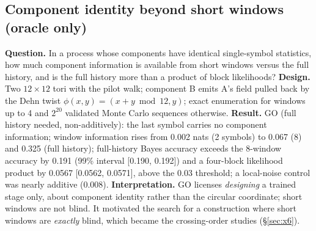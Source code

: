 \documentclass[11pt,a4paper]{article}
\DeclareRobustCommand{\_}{\ifmmode\origunderscore\else\textunderscore\allowbreak\fi}
\begin{document}
\subsection{Component identity beyond short windows (oracle only)}
\textbf{Question.} In a process whose components have identical single-symbol statistics, how
much component information is available from short windows versus the full history, and is the
full history more than a product of block likelihoods? \textbf{Design.} Two $12\times12$ tori with
the pilot walk; component B emits A's field pulled back by the Dehn twist
$\phi(x,y)=(x+y \bmod 12,y)$; exact enumeration for windows up to 4 and $2^{20}$ validated Monte
Carlo sequences otherwise. \textbf{Result.} GO (full history needed, non-additively): the last
symbol carries no component information; window information rises from 0.002 nats (2 symbols)
to 0.067 (8) and 0.325 (full history); full-history Bayes accuracy exceeds the 8-window accuracy by
0.191 (99\% interval [0.190, 0.192]) and a four-block likelihood product by 0.0567 [0.0562, 0.0571], above the 0.03
threshold; a local-noise control was nearly additive (0.008).
\textbf{Interpretation.} GO licenses \emph{designing} a trained stage only, about component identity
rather than the circular coordinate; short windows are not blind. It motivated the search for a
construction where short windows are \emph{exactly} blind, which became the crossing-order
studies (\S\ref{sec:x6}).
\end{document}
